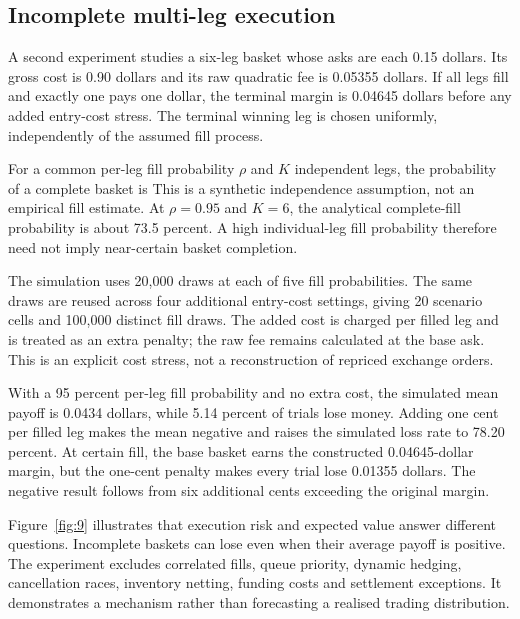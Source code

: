 \subsection{Incomplete multi-leg execution}
A second experiment studies a six-leg basket whose asks are each 0.15 dollars. Its gross cost is 0.90 dollars and its raw quadratic fee is 0.05355 dollars. If all legs fill and exactly one pays one dollar, the terminal margin is 0.04645 dollars before any added entry-cost stress. The terminal winning leg is chosen uniformly, independently of the assumed fill process.

For a common per-leg fill probability $\rho$ and $K$ independent legs, the probability of a complete basket is
This is a synthetic independence assumption, not an empirical fill estimate. At $\rho=0.95$ and $K=6$, the analytical complete-fill probability is about 73.5 percent. A high individual-leg fill probability therefore need not imply near-certain basket completion.

The simulation uses 20,000 draws at each of five fill probabilities. The same draws are reused across four additional entry-cost settings, giving 20 scenario cells and 100,000 distinct fill draws. The added cost is charged per filled leg and is treated as an extra penalty; the raw fee remains calculated at the base ask. This is an explicit cost stress, not a reconstruction of repriced exchange orders.


With a 95 percent per-leg fill probability and no extra cost, the simulated mean payoff is 0.0434 dollars, while 5.14 percent of trials lose money. Adding one cent per filled leg makes the mean negative and raises the simulated loss rate to 78.20 percent. At certain fill, the base basket earns the constructed 0.04645-dollar margin, but the one-cent penalty makes every trial lose 0.01355 dollars. The negative result follows from six additional cents exceeding the original margin.


Figure~\ref{fig:9} illustrates that execution risk and expected value answer different questions. Incomplete baskets can lose even when their average payoff is positive. The experiment excludes correlated fills, queue priority, dynamic hedging, cancellation races, inventory netting, funding costs and settlement exceptions. It demonstrates a mechanism rather than forecasting a realised trading distribution.

\label{sec:discussion}
